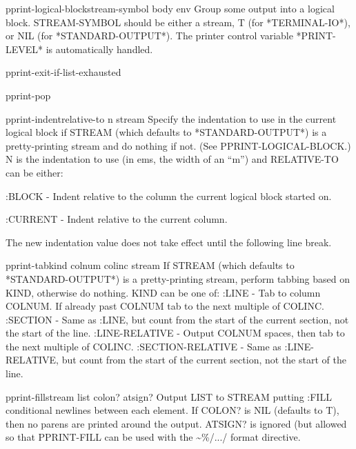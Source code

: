 \documentclass[10pt,english]{book}
\begin{document}
\begin{macro}{pprint-logical-block}{stream-symbol \body body \env env}
  Group some output into a logical block. STREAM-SYMBOL should be either a
   stream, T (for *TERMINAL-IO*), or NIL (for *STANDARD-OUTPUT*). The printer
   control variable *PRINT-LEVEL* is automatically handled.
\end{macro}

\begin{macro}{pprint-exit-if-list-exhausted}{}
  
\end{macro}

\begin{macro}{pprint-pop}{}
  
\end{macro}

\begin{function}{pprint-indent}{relative-to n \op stream}
  Specify the indentation to use in the current logical block if
STREAM (which defaults to *STANDARD-OUTPUT*) is a pretty-printing
stream and do nothing if not. (See PPRINT-LOGICAL-BLOCK.) N is the
indentation to use (in ems, the width of an ``m'') and RELATIVE-TO can
be either:

     :BLOCK - Indent relative to the column the current logical block
        started on.

     :CURRENT - Indent relative to the current column.

The new indentation value does not take effect until the following
line break.
\end{function}

\begin{function}{pprint-tab}{kind colnum colinc \op stream}
  If STREAM (which defaults to *STANDARD-OUTPUT*) is a pretty-printing
   stream, perform tabbing based on KIND, otherwise do nothing. KIND can
   be one of:
     :LINE - Tab to column COLNUM. If already past COLNUM tab to the next
       multiple of COLINC.
     :SECTION - Same as :LINE, but count from the start of the current
       section, not the start of the line.
     :LINE-RELATIVE - Output COLNUM spaces, then tab to the next multiple of
       COLINC.
     :SECTION-RELATIVE - Same as :LINE-RELATIVE, but count from the start
       of the current section, not the start of the line.
\end{function}

\begin{function}{pprint-fill}{stream list \op colon? atsign?}
  Output LIST to STREAM putting :FILL conditional newlines between each
   element. If COLON? is NIL (defaults to T), then no parens are printed
   around the output. ATSIGN? is ignored (but allowed so that PPRINT-FILL
   can be used with the \~{}\%/.../ format directive.
\end{function}
\end{document}
